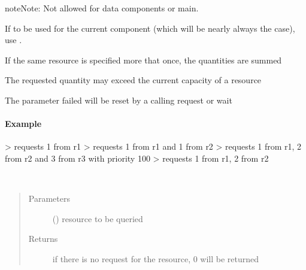 \documentclass[letterpaper,10pt,english]{sphinxmanual}
\begin{document}
\begin{fulllineitems}
\begin{fulllineitems}
\begin{quote}
\begin{description}
\begin{itemize}
\end{itemize}

\end{description}\end{quote}

\begin{sphinxadmonition}{note}{Note:}
Not allowed for data components or main.

If to be used for the current component
(which will be nearly always the case),
use .

If the same resource is specified more that once, the quantities are summed 

The requested quantity may exceed the current capacity of a resource 

The parameter failed will be reset by a calling request or wait
\end{sphinxadmonition}
\paragraph{Example}

\textendash{}\textgreater{} requests 1 from r1 
\textendash{}\textgreater{} requests 1 from r1 and 1 from r2 
\textendash{}\textgreater{} requests 1 from r1, 2 from r2 and 3 from r3 with priority 100 
\textendash{}\textgreater{} requests 1 from r1, 2 from r2 

\end{fulllineitems}


\begin{fulllineitems}
\label{\detokenize{Reference:salabim.Component.requested_quantity}}~\begin{quote}\begin{description}
\item[{Parameters}] \leavevmode
{} () \textendash{} resource to be queried

\item[{Returns}] \leavevmode
{} \textendash{} if there is no request for the resource, 0 will be returned


\end{description}
\end{quote}
\end{fulllineitems}
\end{fulllineitems}
\end{document}
